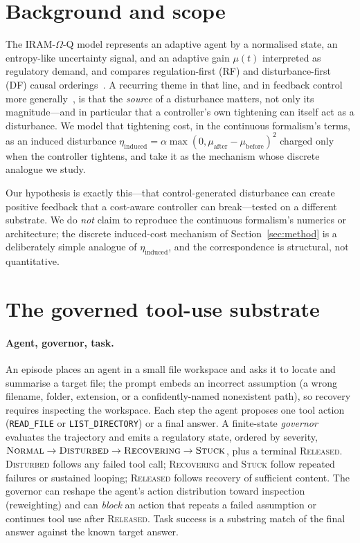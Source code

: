\documentclass[11pt]{article}
\begin{document}
\section{Background and scope}
\label{sec:background}

The IRAM-$\Omega$-Q model represents an adaptive agent by a normalised state,
an entropy-like uncertainty signal, and an adaptive gain $\mu(t)$ interpreted
as regulatory demand, and compares regulation-first (RF) and disturbance-first
(DF) causal orderings~\cite{ziegler2026carryover}. A recurring theme in that
line, and in feedback control more generally~\cite{astrom2008feedback}, is that
the \emph{source} of a disturbance matters, not only its magnitude---and in
particular that a controller's own tightening can itself act as a disturbance.
We model that tightening cost, in the continuous formalism's terms, as an
induced disturbance
$\eta_{\mathrm{induced}} =
\alpha\max(0,\mu_{\mathrm{after}}-\mu_{\mathrm{before}})^2$ charged only when
the controller tightens, and take it as the mechanism whose discrete analogue we
study.

Our hypothesis is exactly this---that control-generated disturbance can create
positive feedback that a cost-aware controller can break---tested on a different
substrate. We do \emph{not} claim to reproduce the continuous formalism's
numerics or architecture; the discrete induced-cost mechanism of
Section~\ref{sec:method} is a deliberately simple analogue of
$\eta_{\mathrm{induced}}$, and the correspondence is structural, not
quantitative.

\section{The governed tool-use substrate}
\label{sec:substrate}

\paragraph{Agent, governor, task.}
An episode places an agent in a small file workspace and asks it to locate and
summarise a target file; the prompt embeds an incorrect assumption (a wrong
filename, folder, extension, or a confidently-named nonexistent path), so
recovery requires inspecting the workspace. Each step the agent proposes one
tool action (\texttt{READ\_FILE} or \texttt{LIST\_DIRECTORY}) or a final
answer. A finite-state \emph{governor} evaluates the trajectory and emits a
regulatory state, ordered by severity,
$\textsc{Normal}\to\textsc{Disturbed}\to\textsc{Recovering}\to\textsc{Stuck}$,
plus a terminal \textsc{Released}. \textsc{Disturbed} follows any failed tool
call; \textsc{Recovering} and \textsc{Stuck} follow repeated failures or
sustained looping; \textsc{Released} follows recovery of sufficient content.
The governor can reshape the agent's action distribution toward inspection
(reweighting) and can \emph{block} an action that repeats a failed assumption
or continues tool use after \textsc{Released}. Task success is a substring
match of the final answer against the known target answer.
\end{document}
